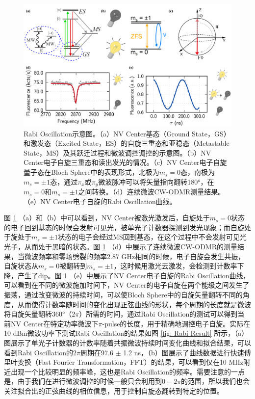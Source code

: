 \documentclass[type = bachelor, oneside]{whu-thesis}
\begin{document}
\begin{figure}
  \centering
  \includegraphics[width=1.0\textwidth]{figures/Chapter 2/Rabi Oscillation.png}
  \caption[Rabi Oscillation示意图]{Rabi Oscillation示意图。（a）NV Center基态（Ground State，GS）和激发态（Excited State，ES）的自旋三重态和亚稳态（Metastable State，MS）及其跃迁过程和微波调控调控的示意图。（b）NV Center电子自旋三重态和读出发光的情况。（c）NV Center电子自旋量子态在Bloch Sphere中的表现形式，北极为$m_s=0$态，南极为$m_s=\pm1$态，通过$\pi_x$或$\pi_y$微波脉冲可以将矢量指向翻转180°，在$m_s=0$和$m_s=\pm1$之间转换。（d）连续微波CW-ODMR测量结果。（e）NV Center电子自旋的Rabi Oscillation曲线。}
  \label{fig: Rabi Oscillation}
\end{figure}
图 \ref{fig: Rabi Oscillation} （a）和（b）中可以看到，NV Center被激光激发后，自旋处于$m_s=0$状态的电子回到基态的时候会发射可见光，被单光子计数器探测到发光现象；而自旋处于旋处于$m_s=\pm1$状态的电子会经过MS回到基态，在这个过程中不会发射可见光光子，从而处于黑暗的状态。图 \ref{fig: Rabi Oscillation} （d）中展示了连续微波CW-ODMR的测量结果，当微波频率和零场劈裂的频率2.87 GHz相同的时候，电子自旋会发生共振，自旋状态从$m_s=0$被翻转到$m_s=\pm1$，这时候用激光去激发，会检测到计数率下降，产生了dip。图 \ref{fig: Rabi Oscillation} （e）中展示了NV Center电子自旋的Rabi Oscillation曲线，可以看到在不同的微波施加时间下，NV Center的电子自旋在两个能级之间发生了振荡，通过改变微波的持续时间，可以使Bloch Sphere中的自旋矢量翻转不同的角度，从而使得计数率随时间的变化出现正弦曲线的形状，每个周期的长度就是微波将自旋矢量翻转360°（$2\pi$）所需的时间，通过Rabi Oscillation的测试可以得到当前NV Center在特定功率微波下$\pi$-pulse的长度，用于精确地调控电子自旋。实际在10 dBm微波功率下测试Rabi Oscillation的结果如图 \ref{fig: Rabi Result} 所示，（a）图展示了单光子计数器的计数率随着共振微波持续时间变化曲线和拟合结果，可以看到Rabi Oscillation的$2\pi$周期在97.6 $\pm$ 1.2 ns，（b）图展示了曲线数据进行快速傅里叶变换（Fast Fourier Transformation，FFT）的结果，可以看到仅在10 MHz附近出现一个比较明显的频率峰，这也是Rabi Oscillation的频率。需要注意的一点是，由于我们在进行微波调控的时候一般只会利用到$0-2\pi$的范围，所以我们也会关注拟合出的正弦曲线的相位信息，用于控制自旋态翻转到特定的位置。
\end{document}
